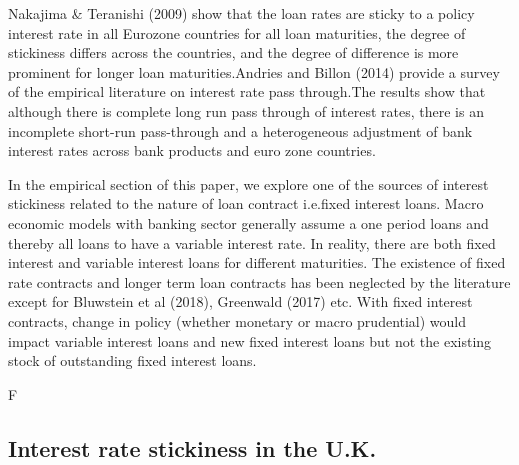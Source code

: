 \documentclass[12pt]{article}
\numberwithin{equation}{section}
\begin{document}
Nakajima \& Teranishi (2009) show that the loan rates are sticky to a policy interest rate in all Eurozone countries for all loan maturities, the degree of stickiness differs across the countries, and the degree of difference is more prominent for longer loan maturities.Andries and Billon (2014) provide a survey of the empirical literature on interest rate pass through.The results show that although there is complete long run pass through of interest rates, there is an incomplete short-run pass-through and a heterogeneous adjustment of bank interest rates across bank products and euro zone countries.

In the empirical section of this paper, we explore one of the sources of interest stickiness related to the nature of loan contract i.e.fixed interest loans. Macro economic models with banking sector generally assume a one period loans and thereby all loans to have a variable interest rate. In reality, there are both fixed interest and variable interest loans for different maturities. The existence of fixed rate contracts and longer term loan contracts has been neglected by the literature except for Bluwstein et al (2018), Greenwald (2017) etc. With fixed interest contracts, change in policy (whether monetary or macro prudential) would impact variable interest loans and new fixed interest loans but not the existing stock of outstanding  fixed interest loans.




F



\subsection{Interest rate stickiness in the U.K.}

\end{document}
